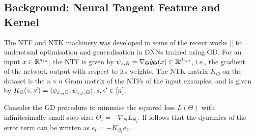 \subsection{Background: Neural Tangent Feature and Kernel}\label{sec:background}
The NTF and NTK machinery was developed in some of the recent works [] to understand optimisation and generalisation in DNNs trained using GD. For an input $x\in\mathbb{R}^{d_{in}}$, the NTF is given by $\psi_{x,\Theta}=\nabla_{\Theta}\hat{y}_{\Theta}(x)\in\mathbb{R}^{d_{net}}$, i.e.,  the gradient of the network output with respect to its weights. The NTK matrix $K_{\Theta}$ on the dataset is the $n\times n$ Gram matrix of the NTFs of the input examples, and is given by $K_{\Theta}(s,s')=\langle \psi_{x_s,\Theta},\psi_{x_{s'},\Theta}\rangle, s,s'\in[n]$. 
\begin{proposition}\label{prop:basic}
Consider the GD procedure to minimise the  squared loss $L(\Theta)$ with infinitesimally small step-size: $\dot{\Theta}_t=-\nabla_{\Theta}L_{\Theta_t} $. If follows that the dynamics of the error term can be written as $\dot{e}_t=-K_{\Theta_t} e_t$. 
\end{proposition}

